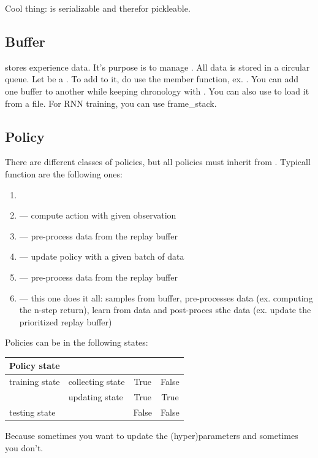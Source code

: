 \documentclass{article}
\begin{document}
Cool thing:
 is serializable and therefor pickleable.

\subsection{Buffer}
 stores experience data.
It's purpose is to manage .
All data is stored in a circular queue.
Let  be a .
To add to it, do use the  member function, ex.
.
You can add one buffer to another while keeping chronology with
.
You can also use  to load it from a file.
For RNN training, you can use frame\_stack.

\subsection{Policy}
There are different classes of policies, but all policies must inherit from .
Typicall function are the following ones:
\begin{enumerate}
		\item {}
		\item {} --- compute action with given observation
		\item {} --- pre-process data from the replay buffer
		\item {} --- update policy with a given batch of data
		\item {} --- pre-process data from the replay buffer
		\item {} --- this one does it all: samples from buffer,
				pre-processes data (ex. computing the n-step return),
				learn from data and post-proces sthe data (ex. update the prioritized replay buffer)
\end{enumerate}

Policies can be in the following states:
\begin{table}[htpb]
		\centering

		\begin{tabular}{l l c c }
				\textbf{Policy state} & & \textbf{\fbox{\texttt{policy.training}}} & \textbf{\fbox{\texttt{policy.updating}}} \\
				\hline
				training state & collecting state & True & False \\
				& updating state & True & True \\
				testing state & & False & False 
		\end{tabular}
\end{table}
Because sometimes you want to update the (hyper)parameters and sometimes you don't.
\end{document}
